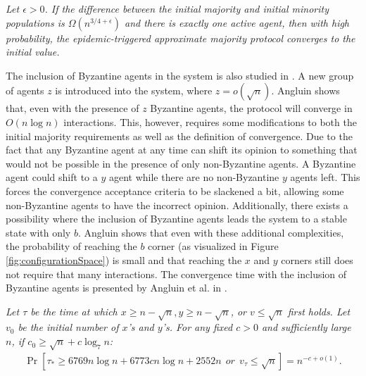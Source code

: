  \begin{theorem}
    \textit{Let $\epsilon > 0$. If the difference between the initial majority and initial minority populations is $\Omega(n^{3/4+\epsilon})$ and there is exactly one active agent, then with high probability, the epidemic-triggered approximate majority protocol converges to the initial value.}
 \end{theorem} 

 The inclusion of Byzantine agents in the system is also studied in \cite{angluinSimplePopulationProtocol2008}. A new group of agents $z$ is introduced into the system, where $z = o(\sqrt{n})$. Angluin shows that, even with the presence of $z$ Byzantine agents, the protocol will converge in $O(n \log n)$ interactions. This, however, requires some modifications to both the initial majority requirements as well as the definition of convergence. Due to the fact that any Byzantine agent at any time can shift its opinion to something that would not be possible in the presence of only non-Byzantine agents. A Byzantine agent could shift to a $y$ agent while there are no non-Byzantine $y$ agents left. This forces the convergence acceptance criteria to be slackened a bit, allowing some non-Byzantine agents to have the incorrect opinion. Additionally, there exists a possibility where the inclusion of Byzantine agents leads the system to a stable state with only $b$. Angluin shows that even with these additional complexities, the probability of reaching the $b$ corner (as visualized in Figure \ref{fig:configurationSpace}) is small and that reaching the $x$ and $y$ corners still does not require that many interactions. The convergence time with the inclusion of Byzantine agents is presented by Angluin et al. in .
 
 \begin{theorem}
    \textit{Let $\tau$ be the time at which $x \geq n - \sqrt{n}, y \geq n - \sqrt{n}$, or $v \leq \sqrt{n}$ first holds. Let $v_0$ be the initial number of $x$'s and $y$'s. For any fixed $c > 0$ and sufficiently large $n$, if $c_0 \geq \sqrt{n} + c \log_7n$:} 
    \begin{align}
        \Pr [ \tau_* \geq 6769n \log n + 6773 c n \log n + 2552n \: \: or \: \: v_{\tau} \leq \sqrt{n}] = n^{-c+o(1)}.  \label{angluinTheorem4} 
    \end{align}
 \end{theorem} 
 
